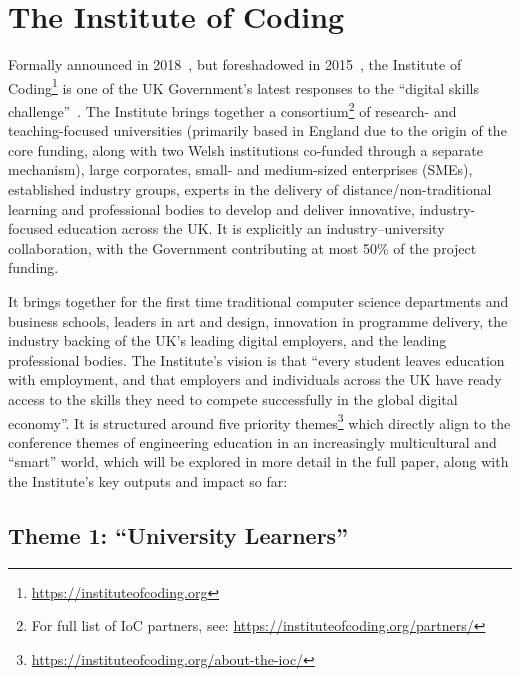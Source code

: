 \documentclass[conference]{IEEEtran}
\begin{document}
\section{The Institute of Coding}\label{ioc}


Formally announced in 2018~\cite{DfE2018a}, but foreshadowed in
2015~\cite{HMG2015a}, the Institute of
Coding\footnote{\url{https://instituteofcoding.org}} is one of the UK
Government's latest responses to the ``digital skills
challenge''~\cite{davenport-et-al:cep2019}. The Institute brings
together a consortium\footnote{For full list of IoC partners, see:
\url{https://instituteofcoding.org/partners/}} of research- and
teaching-focused universities (primarily based in England due to the
origin of the core funding, along with two Welsh institutions
co-funded through a separate mechanism), large corporates, small- and
medium-sized enterprises (SMEs), established industry groups, experts
in the delivery of distance/non-traditional learning and professional
bodies to develop and deliver innovative, industry-focused education
across the UK. It is explicitly an industry--university collaboration,
with the Government contributing at most 50\% of the project funding.

It brings together for the first time traditional computer science
departments and business schools, leaders in art and design,
innovation in programme delivery, the industry backing of the UK's
leading digital employers, and the leading professional bodies.  The
Institute's vision is that ``every student leaves education with
employment, and that employers and individuals across the UK have
ready access to the skills they need to compete successfully in the
global digital economy''. It is structured around five priority
themes\footnote{\url{https://instituteofcoding.org/about-the-ioc/}}
which directly align to the conference themes of engineering education
in an increasingly multicultural and ``smart'' world, which will be
explored in more detail in the full paper, along with the Institute's
key outputs and impact so far:

\subsection*{Theme 1: ``University Learners''}
\end{document}
